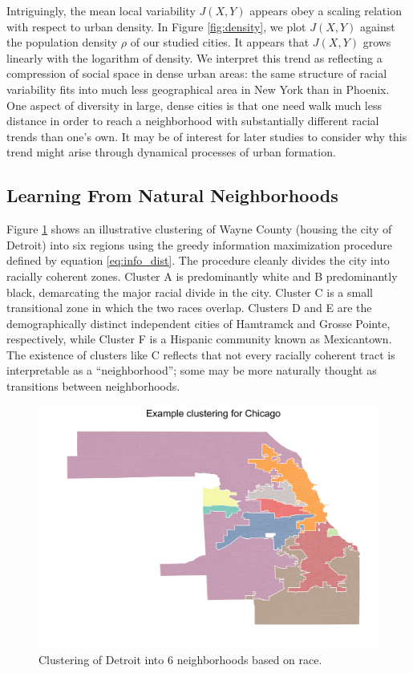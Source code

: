 	Intriguingly, the mean local variability $J(X,Y)$ appears obey a scaling relation with respect to urban density. In Figure \ref{fig:density}, we plot $J(X,Y)$ against the population density $\rho$ of our studied cities. It appears that $J(X,Y)$ grows linearly with the logarithm of density. We interpret this trend as reflecting a compression of social space in dense urban areas: the same structure of racial variability fits into much less geographical area in New York than in Phoenix. One aspect of diversity in large, dense cities is that one need walk much less distance in order to reach a neighborhood with substantially different racial trends than one's own. It may be of interest for later studies to consider why this trend might arise through dynamical processes of urban formation. 
	 
		

\subsection{Learning From Natural Neighborhoods}

	Figure \ref{fig:cluster_map} shows an illustrative clustering of Wayne County (housing the city of Detroit) into six regions using the greedy information maximization procedure defined by equation \eqref{eq:info_dist}. The procedure cleanly divides the city into racially coherent zones. Cluster A is predominantly white and B predominantly black, demarcating the major racial divide in the city. Cluster C is a small transitional zone in which the two races overlap. Clusters D and E are the demographically distinct independent cities of Hamtramck and Grosse Pointe, respectively, while Cluster F is a Hispanic community known as Mexicantown. The existence of clusters like C reflects that not every racially coherent tract is interpretable as a ``neighborhood''; some may be more naturally thought as transitions between neighborhoods. 
	
	\begin{figure}
		\centering
		\includegraphics[width=\textwidth]{figs/example_cluster_map.png}
		\caption{Clustering of Detroit into 6 neighborhoods based on race.}
		\label{fig:cluster_map}
	\end{figure}		

